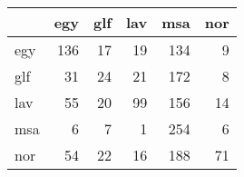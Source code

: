 \begin{tabular}{lrrrrr}
\hline
     &   egy &   glf &   lav &   msa &   nor \\
\hline
 egy &   136 &    17 &    19 &   134 &     9 \\
 glf &    31 &    24 &    21 &   172 &     8 \\
 lav &    55 &    20 &    99 &   156 &    14 \\
 msa &     6 &     7 &     1 &   254 &     6 \\
 nor &    54 &    22 &    16 &   188 &    71 \\
\hline
\end{tabular}